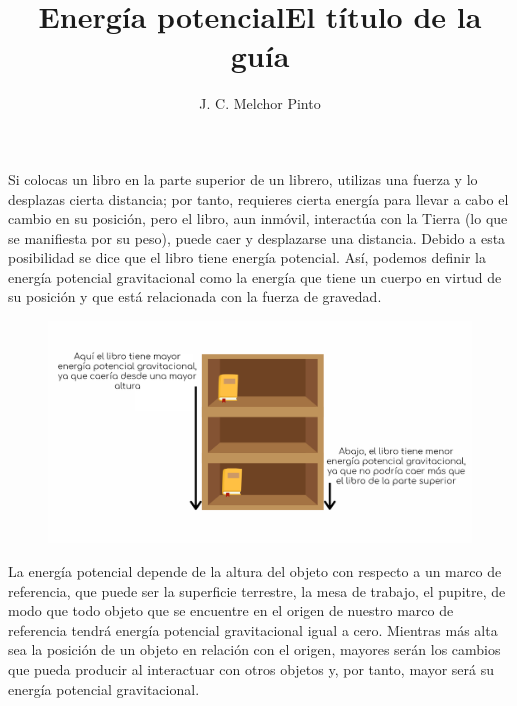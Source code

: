 \documentclass[12pt,addpoints,answers]{guia}
\title{Energía potencial}
\title{El título de la guía}
\author{J. C. Melchor Pinto}
\begin{document}
\pagestyle{headandfoot}

\INFO
\begin{opening}{
        \begin{minipage}{0.45\textwidth}
            Si colocas un libro en la parte superior de un librero, utilizas una fuerza y lo
            desplazas cierta distancia; por tanto, requieres cierta energía para llevar a cabo el
            cambio en su posición, pero el libro, aun inmóvil, interactúa con la Tierra (lo que se
            manifiesta por su peso), puede caer y desplazarse una distancia. Debido a esta
            posibilidad se dice que el libro tiene energía potencial. Así, podemos definir la energía
            potencial gravitacional como la energía que tiene un cuerpo en virtud de su posición
            y que está relacionada con la fuerza de gravedad.
        \end{minipage}\hfill
        \begin{minipage}{0.55\textwidth}
            \begin{figure}[H]
                \centering
                \includegraphics[width=\linewidth]{../images/Gravitational-potential-energy.png}
            \end{figure}%
        \end{minipage}

        La energía potencial depende de la altura del objeto con respecto a un marco de
        referencia, que puede ser la superficie terrestre, la mesa de trabajo, el pupitre,
        de modo que todo objeto que se encuentre en el origen de nuestro marco de referencia tendrá energía potencial gravitacional igual a cero. Mientras más alta sea la posición de un objeto en relación con el origen, mayores serán los cambios que pueda
        producir al interactuar con otros objetos y, por tanto, mayor será su energía potencial
        gravitacional.\\

}
\end{opening}
\end{document}
